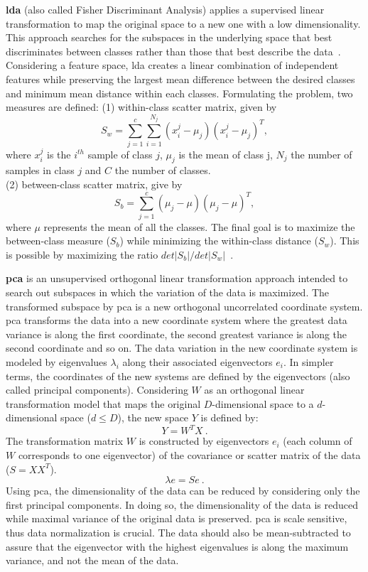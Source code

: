 \begin{description}
\item \textbf{\acf{lda}} (also called Fisher Discriminant Analysis) applies a supervised linear transformation to map the original space to a new one with a low dimensionality.
This approach searches for the subspaces in the underlying space that best discriminates between classes rather than those that best describe the data~\cite{martinez2001pca}. 
Considering a feature space, \ac{lda} creates a linear combination of independent features while preserving the largest mean difference between the desired classes and minimum mean distance within each classes. 
Formulating the problem, two measures are defined: (1) within-class scatter matrix, given by
$$ S_{w} = \sum\limits_{j=1}^{c}\sum\limits_{i=1}^{N_{j}}(x_{i}^{j}-\mu_{j})(x_{i}^{j}-\mu_{j})^{T},$$
\noindent where $x_{i}^{j}$ is the $i^{th}$ sample of class $j$, $\mu_{j}$ is the mean of class j, $N_{j}$ the number of samples in class $j$ and $C$ the number of classes.\\
\noindent(2) between-class scatter matrix, give by  
$$ S_{b} = \sum\limits_{j=1}^{c}(\mu_{j}-\mu)(\mu_{j}-\mu)^{T}, $$
where $\mu$ represents the mean of all the classes.
The final goal is to maximize the between-class measure ($S_{b}$) while minimizing the within-class distance ($S_{w}$). 
This is possible by maximizing the ratio $det\vert S_{b}\vert / det\vert S_{w}\vert$~\cite{martinez2001pca}.

\item \textbf{\Acf{pca}} is an unsupervised orthogonal linear transformation approach intended to search out subspaces in which the variation of the data is maximized. 
The transformed subspace by \ac{pca} is a new orthogonal uncorrelated coordinate system.
\ac{pca} transforms the data into a new coordinate system where the greatest data variance is along the first coordinate, the second greatest variance is along the second coordinate and so on. 
The data variation in the new coordinate system is modeled by eigenvalues $\lambda_{i}$  along their associated eigenvectors $e_{i}$.
In simpler terms, the coordinates of the new systems are defined by the eigenvectors (also called principal components).
Considering $W$ as an orthogonal linear transformation model that maps the original $D$-dimensional space to a $d$-dimensional space ($d \le D$), the new space $Y$ is defined by: 
\begin{equation}
Y = W^{T}X~.
\end{equation}
\noindent The transformation matrix $W$ is constructed by eigenvectors $e_{i}$ (each column of $W$ corresponds to one eigenvector) of the covariance or scatter matrix of the data ($ S = XX^{T}$). 
\begin{equation}
\lambda e = Se~.
\end{equation}
Using \ac{pca}, the dimensionality of the data can be reduced by considering only the first principal components. 
In doing so, the dimensionality of the data is reduced while maximal variance of the original data is preserved. 
\ac{pca} is scale sensitive, thus data normalization is crucial.
The data should also be mean-subtracted to assure that the eigenvector with the highest eigenvalues is along the maximum variance, and not the mean of the data.


\end{description}
